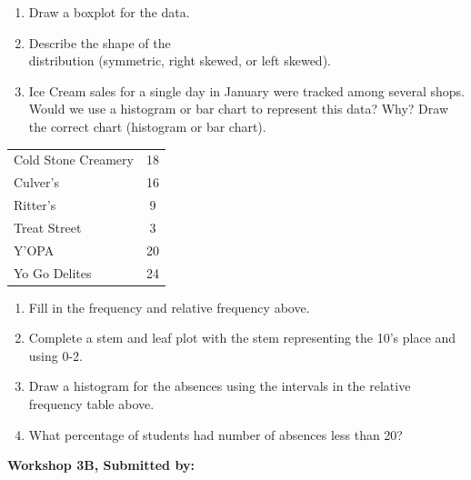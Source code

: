 \documentclass[11pt, chapterprefix=true]{scrbook}\usepackage[]{graphicx}\usepackage[]{color}
\begin{document}
\begin{exercises}
\begin{exercise}
\begin{minipage}[ht]{7cm}
{{\begin{enumerate}
  \item Draw a boxplot for the data.
  \item Describe the shape of the \\ distribution (symmetric, right skewed, or left skewed).
  \item Ice Cream sales for a single day in January were tracked among several shops.  Would we use a histogram or bar chart to represent this data?  Why?  Draw the correct chart (histogram or bar chart).
\end{enumerate}
}}

\end{minipage} \hfill
\begin{minipage}[bht]{7cm}

{\small{
\begin{tabular}{@{} lc @{}} \hline
Cold Stone Creamery	& 18 \\
Culver's &	16 \\
Ritter's &	9 \\
Treat Street &	3 \\
Y'OPA &	20 \\
Yo Go Delites &	24 \\ \hline
\end{tabular}
}}
\end{minipage}
\end{exercise} 
\begin{solution} %

\begin{enumerate}
  \item	Fill in the frequency and relative frequency above.
  \item	Complete a stem and leaf plot with the stem representing the 10's place and using 0-2.
  \item	Draw a histogram for the absences using the intervals in the relative frequency table above.
  \item	What percentage of students had number of absences less than 20?
\end{enumerate}

    \end{solution}
    
\clearpage

    \begin{exercise}  %

    \begin{center}
\begin{flushleft}\textbf{\large \hfill Workshop 3B, Submitted by: }\end{flushleft}


\end{center}
\end{exercise}
\end{exercises}
\end{document}
